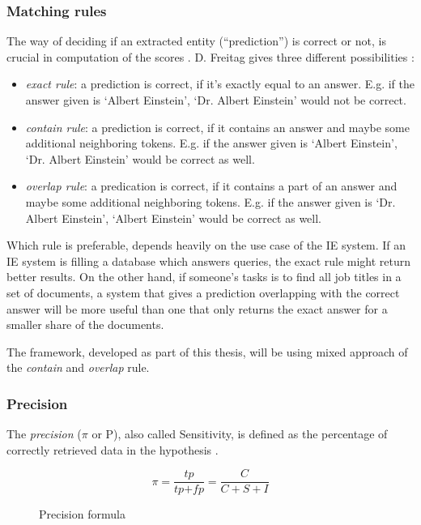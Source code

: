 \subsubsection{Matching rules}
\label{sec:matching-rules}
The way of deciding if an extracted entity (\enquote{prediction}) is correct or not, is crucial in computation of the scores \cite{Sitter:2004}. D. Freitag gives three different possibilities \cite{Freitag:1998}:

\begin{itemize}
	\item \textit{exact rule}: a prediction is correct, if it's exactly equal to an answer. E.g. if the answer given is \enquote*{Albert Einstein}, \enquote*{Dr. Albert Einstein} would not be correct.
	\item \textit{contain rule}: a prediction is correct, if it contains an answer and maybe some additional neighboring tokens. E.g. if the answer given is \enquote*{Albert Einstein}, \enquote*{Dr. Albert Einstein} would be correct as well.
	\item \textit{overlap rule}: a predication is correct, if it contains a part of an answer and maybe some additional neighboring tokens. E.g. if the answer given is \enquote*{Dr. Albert Einstein}, \enquote*{Albert Einstein} would be correct as well.
\end{itemize}

Which rule is preferable, depends heavily on the use case of the \gls{IE} system. If an \gls{IE} system is filling a database which answers queries, the exact rule might return better results. On the other hand, if someone's tasks is to find all job titles in a set of documents, a system that gives a prediction overlapping with the correct answer will be more useful than one that only returns the exact answer for a smaller share of the documents. \cite{Sitter:2004}

The framework, developed as part of this thesis, will be using mixed approach of the \textit{contain} and \textit{overlap} rule.

\subsubsection{Precision}
The \textit{precision} (\ensuremath{\pi} or P), also called Sensitivity, is defined as the percentage of correctly retrieved data in the hypothesis \cite{Carstensen:2010}. 

\begin{figure}[H]
\begin{displaymath}
	\pi = \frac{\textit{tp}}{\textit{tp} + \textit{fp}} = \frac{C}{C+S+I}
\end{displaymath}
\caption{Precision formula}
\end{figure}


